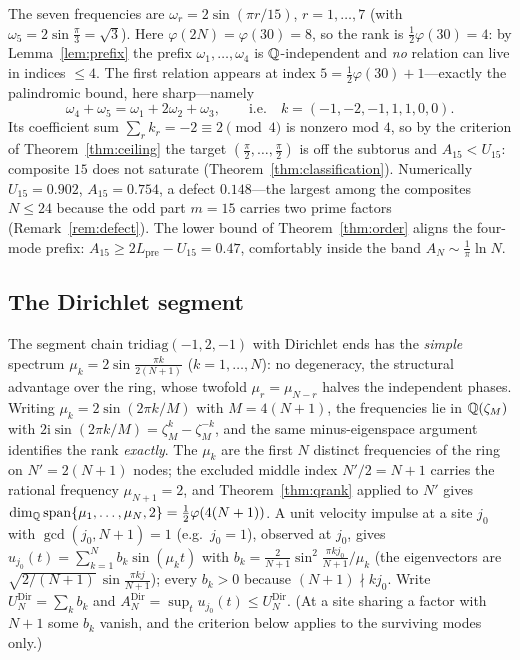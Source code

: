 \begin{example}[the whole mechanism at $N=15$]\label{ex:fifteen}
The seven frequencies are $\omega_r=2\sin(\pi r/15)$, $r=1,\dots,7$ (with $\omega_5=2\sin\tfrac\pi3=\sqrt3$).
Here $\varphi(2N)=\varphi(30)=8$, so the rank is $\tfrac12\varphi(30)=4$: by Lemma~\ref{lem:prefix} the
prefix $\omega_1,\dots,\omega_4$ is $\mathbb{Q}$-independent and \emph{no} relation can live in indices $\le4$.
The first relation appears at index $5=\tfrac12\varphi(30)+1$---exactly the palindromic bound, here
sharp---namely
\[
  \omega_4+\omega_5=\omega_1+2\omega_2+\omega_3,\qquad\text{i.e.}\quad k=(-1,-2,-1,1,1,0,0).
\]
Its coefficient sum $\sum_r k_r=-2\equiv2\pmod4$ is nonzero mod $4$, so by the criterion of
Theorem~\ref{thm:ceiling} the target $(\tfrac\pi2,\dots,\tfrac\pi2)$ is off the subtorus and
$A_{15}<U_{15}$: composite $15$ does not saturate (Theorem~\ref{thm:classification}). Numerically
$U_{15}=0.902$, $A_{15}=0.754$, a defect $0.148$---the largest among the composites $N\le24$ because the odd
part $m=15$ carries two prime factors (Remark~\ref{rem:defect}). The lower bound of Theorem~\ref{thm:order}
aligns the four-mode prefix: $A_{15}\ge2L_{\mathrm{pre}}-U_{15}=0.47$, comfortably inside the band
$A_N\sim\tfrac1\pi\ln N$.
\end{example}

\subsection{The Dirichlet segment}\label{sub:segment}
The segment chain $\mathrm{tridiag}(-1,2,-1)$ with Dirichlet ends has the \emph{simple} spectrum
$\mu_k=2\sin\frac{\pi k}{2(N+1)}$ ($k=1,\dots,N$): no degeneracy, the structural advantage over the
ring, whose twofold $\mu_r=\mu_{N-r}$ halves the independent phases. Writing $\mu_k=2\sin(2\pi k/M)$ with
$M=4(N+1)$, the frequencies lie in $\mathbb{Q}(\zeta_M)$ with $2\mathrm{i}\sin(2\pi k/M)=\zeta_M^k-\zeta_M^{-k}$,
and the same minus-eigenspace argument identifies the rank \emph{exactly}. The $\mu_k$ are the first $N$
distinct frequencies of the ring on $N'=2(N+1)$ nodes; the excluded middle index $N'/2=N+1$ carries the
rational frequency $\mu_{N+1}=2$, and Theorem~\ref{thm:qrank} applied to $N'$ gives
$\dim_{\mathbb{Q}}\operatorname{span}\{\mu_1,\dots,\mu_N,2\}=\tfrac12\varphi(4(N+1))$.
A unit velocity impulse at a site $j_0$ with $\gcd(j_0,N+1)=1$ (e.g.\ $j_0=1$), observed at $j_0$, gives
$u_{j_0}(t)=\sum_{k=1}^Nb_k\sin(\mu_kt)$ with $b_k=\tfrac2{N+1}\sin^2\tfrac{\pi kj_0}{N+1}\big/\mu_k$ (the
eigenvectors are $\sqrt{2/(N+1)}\,\sin\frac{\pi kj}{N+1}$); every $b_k>0$ because $(N+1)\nmid kj_0$. Write
$U_N^{\mathrm{Dir}}=\sum_kb_k$ and $A_N^{\mathrm{Dir}}=\sup_tu_{j_0}(t)\le U_N^{\mathrm{Dir}}$. (At a site sharing a
factor with $N+1$ some $b_k$ vanish, and the criterion below applies to the surviving modes only.)

